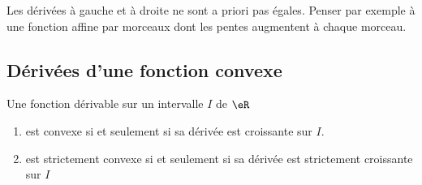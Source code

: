 \begin{remark}
    Les dérivées à gauche et à droite ne sont a priori pas égales. Penser par exemple à une fonction affine par morceaux dont les pentes augmentent à chaque morceau.
\end{remark}

\subsection{Dérivées d'une fonction convexe}

\begin{proposition} \label{PropYKwTDPX}
    Une fonction dérivable sur un intervalle \( I\) de \( \eR\)
    \begin{enumerate}
        \item       \label{ITEMooUTSAooJvhZNm}
            est convexe si et seulement si sa dérivée est croissante sur \( I\).
        \item       \label{ITEMooLLSIooFwkxtV}
            est strictement convexe si et seulement si sa dérivée est strictement croissante sur \( I\)
    \end{enumerate}
\end{proposition}

